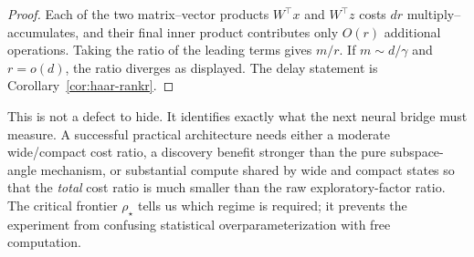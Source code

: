 \begin{proof}
Each of the two matrix--vector products $W^\top x$ and $W^\top z$ costs $dr$ multiply--accumulates, and their final inner product contributes only $O(r)$ additional operations. Taking the ratio of the leading terms gives $m/r$. If $m\sim d/\gamma$ and $r=o(d)$, the ratio diverges as displayed. The delay statement is Corollary~\ref{cor:haar-rankr}.
\end{proof}

\begin{remark}
This is not a defect to hide. It identifies exactly what the next neural bridge must measure. A successful practical architecture needs either a moderate wide/compact cost ratio, a discovery benefit stronger than the pure subspace-angle mechanism, or substantial compute shared by wide and compact states so that the \emph{total} cost ratio is much smaller than the raw exploratory-factor ratio. The critical frontier $\rho_\star$ tells us which regime is required; it prevents the experiment from confusing statistical overparameterization with free computation.
\end{remark}
